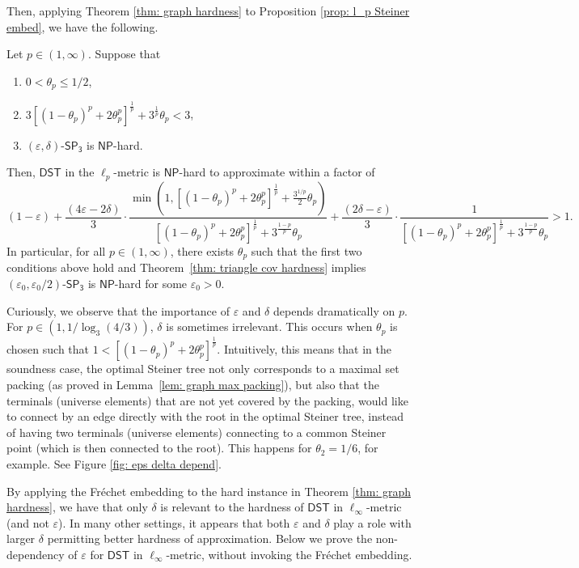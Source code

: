 \documentclass{theoretics}
\newcommand{\1}{\textbf{1}}
\newcommand{\setpT}{$\mathsf{SP_3}$\xspace}
\newcommand{\dst}{$\mathsf{DST}$\xspace}
\newcommand{\np}{$\mathsf{NP}$\xspace}
\newcommand{\pcoord}{\theta_p}
\begin{document}
Then, applying Theorem \ref{thm: graph hardness} to Proposition \ref{prop: l_p Steiner embed}, we have the following.
\begin{theorem} \label{thm: hardness of lp dst}
Let $p \in (1, \infty)$. Suppose that 
\begin{enumerate}
    \item $0 < \pcoord \leq 1/2$,
    \item $3[(1-\pcoord)^p + 2\pcoord^p]^{\frac{1}{p}} + 3^{\frac{1}{p}}\pcoord < 3$,
    \item $(\varepsilon, \delta)$-\setpT is \np-hard.
\end{enumerate}
Then,  \dst in the  $\ell_p$-metric  is \np-hard to approximate within a factor of 
\[
(1 - \varepsilon) + \frac{(4\varepsilon  - 2\delta)}{3} \cdot \frac{\min(1, [(1-\pcoord)^p + 2\pcoord^p]^{\frac{1}{p}} +\frac{3^{1/p}}{2}\pcoord)}{[(1-\pcoord)^p + 2\pcoord^p]^{\frac{1}{p}} + 3^{\frac{1-p}{p}}\pcoord} + \frac{(2\delta  - \varepsilon)}{3} \cdot \frac {1}{[(1-\pcoord)^p + 2\pcoord^p]^{\frac{1}{p}} + 3^{\frac{1-p}{p}}\pcoord}> 1.
\]
In particular, for all $p \in (1,\infty)$, there exists $\pcoord$ such that the first two conditions above hold and Theorem~\ref{thm: triangle cov hardness} implies $(\varepsilon_0,\varepsilon_0/2)$-\setpT is \np-hard for some $\varepsilon_0>0$.
\end{theorem}
\begin{remark} \label{rmk: role of eps and delta}
Curiously, we observe that the importance of $\varepsilon$ and $\delta$ depends dramatically on $p$. For $p \in (1, 1/\log_3(4/3))$, $\delta$ is sometimes irrelevant. This occurs when $\theta_p$ is chosen such that $1 < [(1-\pcoord)^p + 2\pcoord^p]^{\frac{1}{p}}$. Intuitively, this means that in the soundness case, the optimal Steiner tree not only corresponds to a maximal set packing (as proved in Lemma~\ref{lem: graph max packing}), but also that the terminals (universe elements) that are not yet covered by the packing, would like to connect by an edge directly with the root in the optimal Steiner tree, instead of having two terminals (universe elements) connecting to a common Steiner point (which is then connected to the root). This happens for $\theta_2 = 1/6$, for example. See Figure \ref{fig: eps delta depend}.
\end{remark}

By applying the Fr\'echet embedding to the hard instance in Theorem \ref{thm: graph hardness},  we have that only $\delta$ is relevant to the hardness of  \dst in $\ell_{\infty}$-metric (and not $\varepsilon$). 
In many other settings, it appears that both $\varepsilon$ and $\delta$ play a role with larger $\delta$ permitting better hardness of approximation. Below we prove the non-dependency of $\varepsilon$ for \dst in $\ell_\infty$-metric, without invoking the Fr\'echet embedding.
\end{document}
